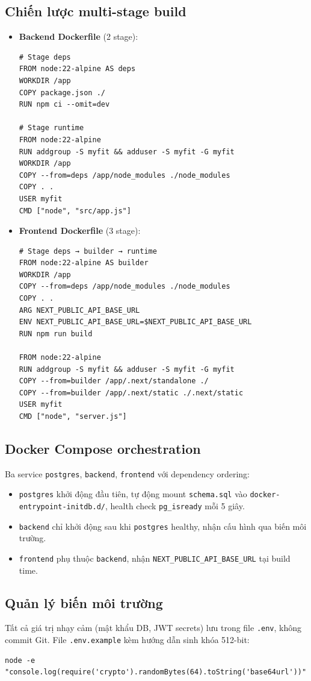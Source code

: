 \subsection{Chiến lược multi-stage build}
\begin{itemize}
    \item \textbf{Backend Dockerfile} (2 stage):
    \begin{verbatim}
# Stage deps
FROM node:22-alpine AS deps
WORKDIR /app
COPY package.json ./
RUN npm ci --omit=dev

# Stage runtime
FROM node:22-alpine
RUN addgroup -S myfit && adduser -S myfit -G myfit
WORKDIR /app
COPY --from=deps /app/node_modules ./node_modules
COPY . .
USER myfit
CMD ["node", "src/app.js"]
    \end{verbatim}

    \item \textbf{Frontend Dockerfile} (3 stage):
    \begin{verbatim}
# Stage deps → builder → runtime
FROM node:22-alpine AS builder
WORKDIR /app
COPY --from=deps /app/node_modules ./node_modules
COPY . .
ARG NEXT_PUBLIC_API_BASE_URL
ENV NEXT_PUBLIC_API_BASE_URL=$NEXT_PUBLIC_API_BASE_URL
RUN npm run build

FROM node:22-alpine
RUN addgroup -S myfit && adduser -S myfit -G myfit
COPY --from=builder /app/.next/standalone ./
COPY --from=builder /app/.next/static ./.next/static
USER myfit
CMD ["node", "server.js"]
    \end{verbatim}
\end{itemize}

\subsection{Docker Compose orchestration}
Ba service \texttt{postgres}, \texttt{backend}, \texttt{frontend} với dependency ordering:
\begin{itemize}
    \item \texttt{postgres} khởi động đầu tiên, tự động mount \texttt{schema.sql} vào \texttt{docker-entrypoint-initdb.d/}, health check \texttt{pg\_isready} mỗi 5 giây.
    \item \texttt{backend} chỉ khởi động sau khi \texttt{postgres} healthy, nhận cấu hình qua biến môi trường.
    \item \texttt{frontend} phụ thuộc \texttt{backend}, nhận \texttt{NEXT\_PUBLIC\_API\_BASE\_URL} tại build time.
\end{itemize}

\subsection{Quản lý biến môi trường}
Tất cả giá trị nhạy cảm (mật khẩu DB, JWT secrets) lưu trong file \texttt{.env}, không commit Git. File \texttt{.env.example} kèm hướng dẫn sinh khóa 512-bit:
\begin{verbatim}
node -e "console.log(require('crypto').randomBytes(64).toString('base64url'))"
\end{verbatim}


